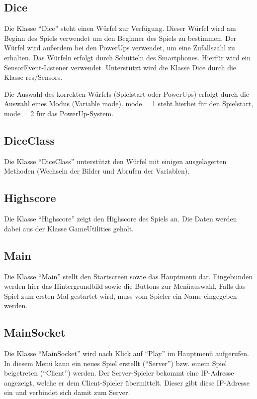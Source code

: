 \documentclass[11pt]{article} %
\begin{document}
\subsection{Dice}
Die Klasse \enquote{Dice} steht einen Würfel zur Verfügung. Dieser Würfel wird am Beginn des Spiels verwendet um den Beginner des Spiels zu bestimmen. Der Würfel wird außerdem bei den PowerUps verwendet, um eine Zufallszahl zu erhalten.
Das Würfeln erfolgt durch Schütteln des Smartphones. Hierfür wird ein SensorEvent-Listener verwendet. Unterstützt wird die Klasse Dice durch die Klasse res/Sensors.

Die Auswahl des korrekten Würfels (Spielstart oder PowerUps) erfolgt durch die Auswahl eines Modus (Variable mode). mode = 1 steht hierbei für den Spielstart, mode = 2 für das PowerUp-System.

\subsection{DiceClass}
Die Klasse \enquote{DiceClass} unterstützt den Würfel mit einigen ausgelagerten Methoden (Wechseln der Bilder und Abrufen der Variablen).

\subsection{Highscore}
Die Klasse \enquote{Highscore} zeigt den Highscore des Spiels an. Die Daten werden dabei aus der Klasse GameUtilities geholt.

\subsection{Main}
Die Klasse \enquote{Main} stellt den Startscreen sowie das Hauptmenü dar. Eingebunden werden hier das Hintergrundbild sowie die Buttons zur Menüauswahl. Falls das Spiel zum ersten Mal gestartet wird, muss vom Spieler ein Name eingegeben werden.

\subsection{MainSocket}
Die Klasse \enquote{MainSocket} wird nach Klick auf \enquote{Play} im Hauptmenü aufgerufen. In diesem Menü kann ein neues Spiel erstellt (\enquote{Server}) bzw. einem Spiel beigetreten (\enquote{Client}) werden.
Der Server-Spieler bekommt eine IP-Adresse angezeigt, welche er dem Client-Spieler übermittelt. Dieser gibt diese IP-Adresse ein und verbindet sich damit zum Server.
\end{document}
